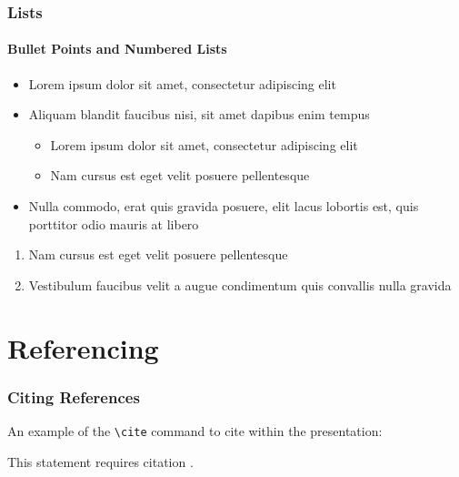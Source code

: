 \documentclass[
	11pt, %
]{beamer}
\begin{document}

\begin{frame}
	\frametitle{Lists}
	\framesubtitle{Bullet Points and Numbered Lists} %
	
	\begin{itemize}
		\item Lorem ipsum dolor sit amet, consectetur adipiscing elit
		\item Aliquam blandit faucibus nisi, sit amet dapibus enim tempus
		\begin{itemize}
			\item Lorem ipsum dolor sit amet, consectetur adipiscing elit
			\item Nam cursus est eget velit posuere pellentesque
		\end{itemize}
		\item Nulla commodo, erat quis gravida posuere, elit lacus lobortis est, quis porttitor odio mauris at libero
	\end{itemize}
	
	\bigskip %
	
	\begin{enumerate}
		\item Nam cursus est eget velit posuere pellentesque
		\item Vestibulum faucibus velit a augue condimentum quis convallis nulla gravida 
	\end{enumerate}
\end{frame}



\section{Referencing}

\begin{frame}
	\frametitle{Citing References}
	
	An example of the \texttt{\textbackslash cite} command to cite within the presentation:
	
	\bigskip %
	
	This statement requires citation \cite{p1,p2}.
\end{frame}

\end{document}
